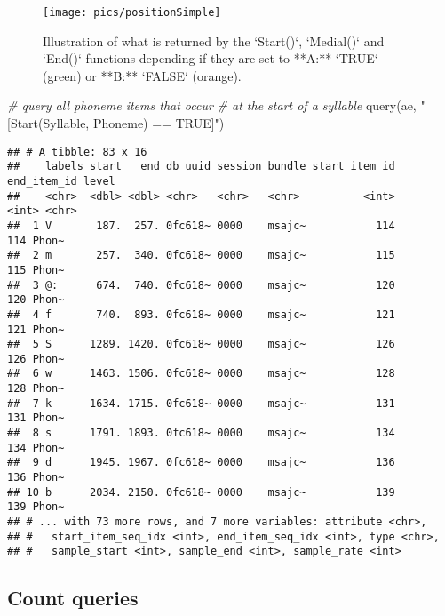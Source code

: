 \documentclass[
]{book}
\newenvironment{Shaded}{\begin{snugshade}}{\end{snugshade}}
\newcommand{\CommentTok}[1]{\textcolor[rgb]{0.56,0.35,0.01}{\textit{#1}}}
\newcommand{\FunctionTok}[1]{\textcolor[rgb]{0.00,0.00,0.00}{#1}}
\newcommand{\NormalTok}[1]{#1}
\newcommand{\StringTok}[1]{\textcolor[rgb]{0.31,0.60,0.02}{#1}}
\begin{document}
\begin{figure}

{\centering \texttt{[image: pics/positionSimple]} 

}

\caption{Illustration of what is returned by the `Start()`, `Medial()` and `End()` functions depending if they are set to **A:** `TRUE` (green) or **B:** `FALSE` (orange).}\label{fig:query-positionSimple}
\end{figure}

\begin{Shaded}
\begin{Highlighting}[]
\CommentTok{\# query all phoneme items that occur}
\CommentTok{\# at the start of a syllable}
\FunctionTok{query}\NormalTok{(ae, }\StringTok{"[Start(Syllable, Phoneme) == TRUE]"}\NormalTok{)}
\end{Highlighting}
\end{Shaded}

\begin{verbatim}
## # A tibble: 83 x 16
##    labels start   end db_uuid session bundle start_item_id end_item_id level
##    <chr>  <dbl> <dbl> <chr>   <chr>   <chr>          <int>       <int> <chr>
##  1 V       187.  257. 0fc618~ 0000    msajc~           114         114 Phon~
##  2 m       257.  340. 0fc618~ 0000    msajc~           115         115 Phon~
##  3 @:      674.  740. 0fc618~ 0000    msajc~           120         120 Phon~
##  4 f       740.  893. 0fc618~ 0000    msajc~           121         121 Phon~
##  5 S      1289. 1420. 0fc618~ 0000    msajc~           126         126 Phon~
##  6 w      1463. 1506. 0fc618~ 0000    msajc~           128         128 Phon~
##  7 k      1634. 1715. 0fc618~ 0000    msajc~           131         131 Phon~
##  8 s      1791. 1893. 0fc618~ 0000    msajc~           134         134 Phon~
##  9 d      1945. 1967. 0fc618~ 0000    msajc~           136         136 Phon~
## 10 b      2034. 2150. 0fc618~ 0000    msajc~           139         139 Phon~
## # ... with 73 more rows, and 7 more variables: attribute <chr>,
## #   start_item_seq_idx <int>, end_item_seq_idx <int>, type <chr>,
## #   sample_start <int>, sample_end <int>, sample_rate <int>
\end{verbatim}

\hypertarget{subsec:query-countQueries}{%
\subsection{Count queries}\label{subsec:query-countQueries}}
\end{document}
